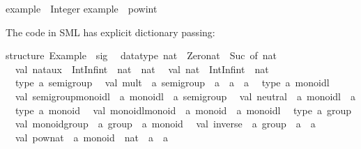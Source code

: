 \begin{isabellebody}
\begin{isamarkuptext}
\isanewline
example\ {\isacharcolon}{\isacharcolon}\ Integer{\isacharsemicolon}\isanewline
example\ {\isacharequal}\ pow{\isacharunderscore}int\ {}{}\ {\isacharparenleft}{\isacharminus}{}{\isacharparenright}{\isacharsemicolon}\isanewline
\isanewline
{\isacharbraceright}\isanewline%
\end{isamarkuptext}%
\isamarkuptrue%
%
\endisatagtypewriter
{\isafoldtypewriter}%
%
\isadelimtypewriter
%
\endisadelimtypewriter
%
\begin{isamarkuptext}%
\noindent The code in SML has explicit dictionary passing:%
\end{isamarkuptext}%
\isamarkuptrue%
%
\isadelimtypewriter
%
\endisadelimtypewriter
%
\isatagtypewriter
%
\begin{isamarkuptext}%
structure\ Example\ {\isacharcolon}\ sig\isanewline
\ \ datatype\ nat\ {\isacharequal}\ Zero{\isacharunderscore}nat\ {\isacharbar}\ Suc\ of\ nat\isanewline
\ \ val\ nat{\isacharunderscore}aux\ {\isacharcolon}\ IntInf{\isachardot}int\ {\isacharminus}{\isachargreater}\ nat\ {\isacharminus}{\isachargreater}\ nat\isanewline
\ \ val\ nat\ {\isacharcolon}\ IntInf{\isachardot}int\ {\isacharminus}{\isachargreater}\ nat\isanewline
\ \ type\ {\isacharprime}a\ semigroup\isanewline
\ \ val\ mult\ {\isacharcolon}\ {\isacharprime}a\ semigroup\ {\isacharminus}{\isachargreater}\ {\isacharprime}a\ {\isacharminus}{\isachargreater}\ {\isacharprime}a\ {\isacharminus}{\isachargreater}\ {\isacharprime}a\isanewline
\ \ type\ {\isacharprime}a\ monoidl\isanewline
\ \ val\ semigroup{\isacharunderscore}monoidl\ {\isacharcolon}\ {\isacharprime}a\ monoidl\ {\isacharminus}{\isachargreater}\ {\isacharprime}a\ semigroup\isanewline
\ \ val\ neutral\ {\isacharcolon}\ {\isacharprime}a\ monoidl\ {\isacharminus}{\isachargreater}\ {\isacharprime}a\isanewline
\ \ type\ {\isacharprime}a\ monoid\isanewline
\ \ val\ monoidl{\isacharunderscore}monoid\ {\isacharcolon}\ {\isacharprime}a\ monoid\ {\isacharminus}{\isachargreater}\ {\isacharprime}a\ monoidl\isanewline
\ \ type\ {\isacharprime}a\ group\isanewline
\ \ val\ monoid{\isacharunderscore}group\ {\isacharcolon}\ {\isacharprime}a\ group\ {\isacharminus}{\isachargreater}\ {\isacharprime}a\ monoid\isanewline
\ \ val\ inverse\ {\isacharcolon}\ {\isacharprime}a\ group\ {\isacharminus}{\isachargreater}\ {\isacharprime}a\ {\isacharminus}{\isachargreater}\ {\isacharprime}a\isanewline
\ \ val\ pow{\isacharunderscore}nat\ {\isacharcolon}\ {\isacharprime}a\ monoid\ {\isacharminus}{\isachargreater}\ nat\ {\isacharminus}{\isachargreater}\ {\isacharprime}a\ {\isacharminus}{\isachargreater}\ {\isacharprime}a\isanewline

\end{isamarkuptext}
\end{isabellebody}
